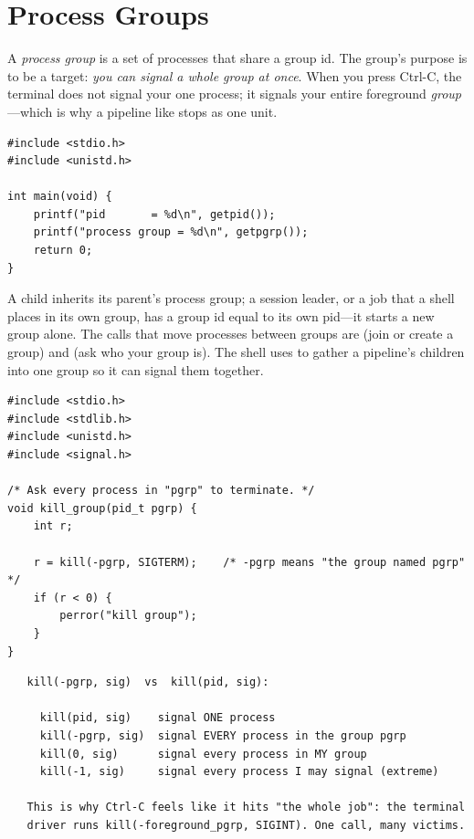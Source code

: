\section{Process Groups}

A \emph{process group} is a set of processes that share a group id. The
group's purpose is to be a target: \emph{you can signal a whole group
at once}. When you press Ctrl-C, the terminal does not signal your one
process; it signals your entire foreground \emph{group}---which is why
a pipeline like  stops as one unit.

\begin{lstlisting}[caption={Who am I, and who is my group?}]
#include <stdio.h>
#include <unistd.h>

int main(void) {
    printf("pid       = %d\n", getpid());
    printf("process group = %d\n", getpgrp());
    return 0;
}
\end{lstlisting}

A child inherits its parent's process group; a session leader, or a job
that a shell places in its own group, has a group id equal to its own
pid---it starts a new group alone. The calls that move processes between groups are
 (join or create a group) and  (ask who
your group is). The shell uses  to gather a pipeline's
children into one group so it can signal them together.

\begin{lstlisting}[caption={Signal a whole group: note the minus sign.}]
#include <stdio.h>
#include <stdlib.h>
#include <unistd.h>
#include <signal.h>

/* Ask every process in "pgrp" to terminate. */
void kill_group(pid_t pgrp) {
    int r;

    r = kill(-pgrp, SIGTERM);    /* -pgrp means "the group named pgrp" */
    if (r < 0) {
        perror("kill group");
    }
}
\end{lstlisting}

\begin{verbatim}
   kill(-pgrp, sig)  vs  kill(pid, sig):

     kill(pid, sig)    signal ONE process
     kill(-pgrp, sig)  signal EVERY process in the group pgrp
     kill(0, sig)      signal every process in MY group
     kill(-1, sig)     signal every process I may signal (extreme)

   This is why Ctrl-C feels like it hits "the whole job": the terminal
   driver runs kill(-foreground_pgrp, SIGINT). One call, many victims.
\end{verbatim}


